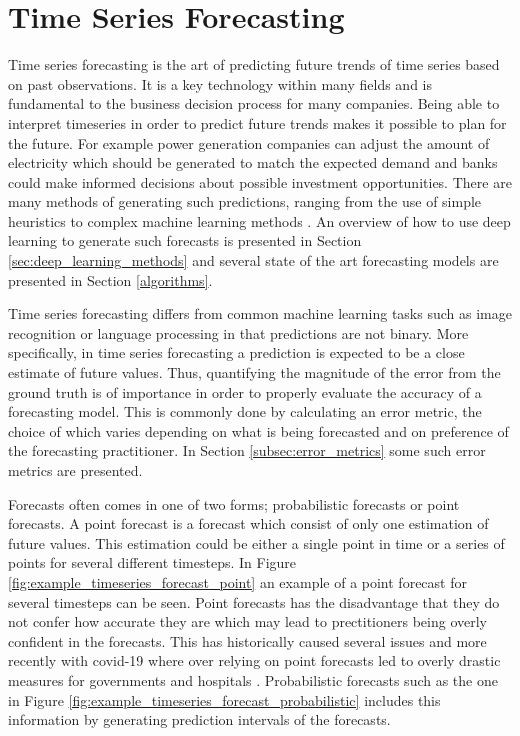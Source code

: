 \section{Time Series Forecasting}
\label{sec_time_series_forecasting}
Time series forecasting is the art of predicting future trends of time series based on past observations. It is a key technology within many fields and is fundamental to the business decision process for many companies. Being able to interpret timeseries in order to predict future trends makes it possible to plan for the future. For example power generation companies can adjust the amount of electricity which should be generated to match the expected demand and banks could make informed decisions about possible investment opportunities. There are many methods of generating such predictions, ranging from the use of simple heuristics to complex machine learning methods \cite{hyndman_forecasting_3rd}. An overview of how to use deep learning to generate such forecasts is presented in Section \ref{sec:deep_learning_methods} and several state of the art forecasting models are presented in Section \ref{algorithms}.

Time series forecasting differs from common machine learning tasks such as image recognition or language processing in that predictions are not binary. More specifically, in time series forecasting a prediction is expected to be a close estimate of future values. Thus, quantifying the magnitude of the error from the ground truth is of importance in order to properly evaluate the accuracy of a forecasting model. This is commonly done by calculating an error metric, the choice of which varies depending on what is being forecasted and on preference of the forecasting practitioner. \cite{hyndman_forecasting_3rd,hyndman_measuring_nodate, willmott_advantages_2005} In Section \ref{subsec:error_metrics} some such error metrics are presented.

Forecasts often comes in one of two forms; probabilistic forecasts or point forecasts. A point forecast is a forecast which consist of only one estimation of future values. This estimation could be either a single point in time or a series of points for several different timesteps. In Figure \ref{fig:example_timeseries_forecast_point} an example of a point forecast for several timesteps can be seen. Point forecasts has the disadvantage that they do not confer how accurate they are which may lead to prectitioners being overly confident in the forecasts. This has historically caused several issues and more recently with covid-19 where over relying on point forecasts led to overly drastic measures for governments and hospitals \cite{IOANNIDIS2020}. Probabilistic forecasts such as the one in Figure \ref{fig:example_timeseries_forecast_probabilistic} includes this information by generating prediction intervals of the forecasts.

